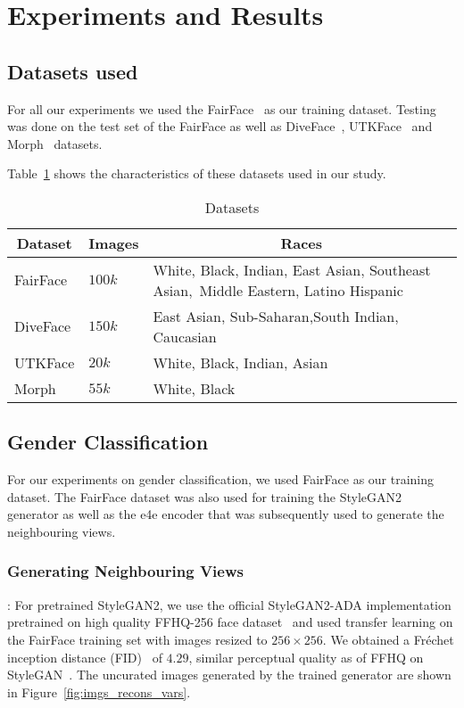 \documentclass[runningheads]{llncs}
\begin{document}
\section{Experiments and Results}
\subsection{Datasets used}
For all our experiments we used the FairFace~\cite{fairface} as our training dataset. Testing was done on the test set of the FairFace as well as DiveFace~\cite{diveface}, UTKFace~\cite{utkface} and Morph~\cite{morph} datasets.

Table~\ref{tab:datasets} shows the characteristics of these datasets used in our study.

\begin{table}[!ht]
    \centering
    \caption{Datasets}
    \label{tab:datasets}
    \begin{tabular}{llp{8cm}}
    \toprule
    \multicolumn{1}{c}{\textbf{Dataset}} & \multicolumn{1}{c}{\textbf{Images}} & \multicolumn{1}{c}{\textbf{Races}} \\ \midrule
    FairFace & $100k$ & White, Black, Indian, East Asian, Southeast Asian,~Middle Eastern, Latino Hispanic \\
    DiveFace & $150k$ & East Asian, Sub-Saharan,South Indian, Caucasian \\
    UTKFace & $20k$ & White, Black, Indian, Asian \\
    Morph & $55k$ & White, Black\\
    \bottomrule
    \end{tabular}
\end{table}

\subsection{Gender Classification}
For our experiments on gender classification, we used FairFace as our training dataset. The FairFace dataset was also used for training the StyleGAN2 generator as well as the e4e encoder that was subsequently used to generate the neighbouring views. 




\subsubsection{\textbf{Generating Neighbouring Views}}: For pretrained StyleGAN2, we use the official StyleGAN2-ADA implementation pretrained on high quality FFHQ-256 face dataset~\cite{stylegan} and used transfer learning on the FairFace training set with images resized to $256 \times 256$. We obtained a Fréchet inception distance (FID)~\cite{fid} of $4.29$, similar perceptual quality as of FFHQ on StyleGAN~\cite{stylegan}. The uncurated images generated by the trained generator are shown in Figure~\ref{fig:imgs_recons_vars}.
\end{document}
